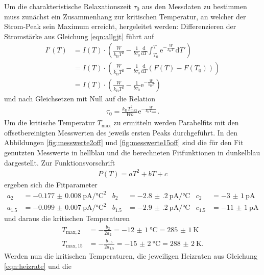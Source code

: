 Um die charakteristische Relaxationszeit $\tau_0$ aus den Messdaten zu bestimmen muss
zunächst ein Zusammenhang zur kritischen Temperatur, an welcher der Strom-Peak
sein Maximum erreicht, hergeleitet werden: Differenzieren der Stromstärke aus
Gleichung \eqref{eqn:allgjt} führt auf
\begin{align}
  I'(T) &= I(T) \cdot \left(\frac{W}{k_\text{B} T^2} - \frac1{b \tau_0} \frac{\mathrm{d}}{\mathrm{d}T} \int_{T_0}^{T} \mathrm{e}^{-\frac{W}{k_\text{B} T'}} \mathrm{d}{T'}\right) \\
  &= I(T) \cdot \left(\frac{W}{k_\text{B} T^2} - \frac1{b \tau_0} \frac{\mathrm{d}}{\mathrm{d}T} \left(F(T) - F(T_0)\right)\right) \\
  &= I(T) \cdot \left(\frac{W}{k_\text{B} T^2} - \frac1{b \tau_0} \mathrm{e}^{-\frac{W}{k_\text{B} T}}\right)
\end{align}
und nach Gleichsetzen mit Null auf die Relation
\begin{align}
  \tau_0 = \frac{k_\text{B} T_\text{max}^2}{W b} \mathrm{e}^{-\frac{W}{k_\text{B} T_\text{max}}}.
  \label{eqn:tau0}
\end{align}
Um die kritische Temperatur $T_\text{max}$ zu ermitteln werden Parabelfits mit den offsetbereinigten
Messwerten des jeweils ersten Peaks durchgeführt. In den Abbildungen \ref{fig:messwerte2off} und \ref{fig:messwerte15off}
sind die für den Fit genutzten Messwerte in hellblau und die berechneten Fitfunktionen in dunkelblau dargestellt.
Zur Funktionsvorschrift
\begin{align}
  P(T) = a T^2 + b T + c
\end{align}
ergeben sich die Fitparameter
\begin{align*}
  a_{2} &= \SI{-0.177(8)}{\pico\ampere\per\celsius\squared} & b_{2} &= \SI{-2.8(2)}{\pico\ampere\per\celsius} & c_{2} &= \SI{-3(1)}{\pico\ampere} \\
  a_{1.5} &= \SI{-0.099(7)}{\pico\ampere\per\celsius\squared} & b_{1.5} &= \SI{-2.9(2)}{\pico\ampere\per\celsius} & c_{1.5} &= \SI{-11(1)}{\pico\ampere}
\end{align*}
und daraus die kritischen Temperaturen
\begin{align}
  T_{\text{max},2} &= -\frac{b_{2}}{2 a_{2}} = \SI{-12(1)}{\celsius} = \SI{285(1)}{\kelvin}\\
  T_{\text{max},15} &= -\frac{b_{1.5}}{2 a_{1.5}} = \SI{-15(2)}{\celsius} = \SI{288(2)}{\kelvin}.
\end{align}
Werden nun die kritischen Temperaturen, die jeweiligen Heizraten aus Gleichung \eqref{eqn:heizrate} und die
